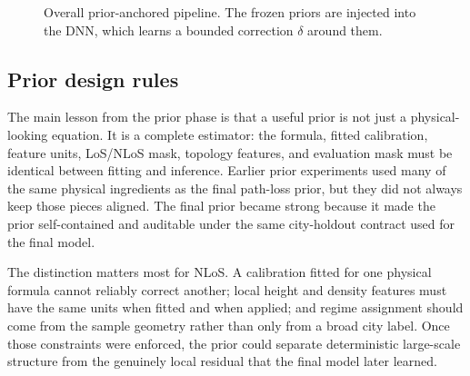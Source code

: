 \begin{figure}[H]
\centering
{}
\caption[Overall prior-anchored pipeline with bounded DNN corrections.]
{Overall prior-anchored pipeline. The frozen priors are injected into the DNN, which learns a bounded correction $\delta$ around them.}
\label{fig:pipeline}
\end{figure}

\subsection{Prior design rules}
\label{sec:good_prior_design}

The main lesson from the prior phase is that a useful prior is not just a
physical-looking equation. It is a complete estimator: the formula, fitted
calibration, feature units, LoS/NLoS mask, topology features, and evaluation
mask must be identical between fitting and inference. Earlier prior experiments
used many of the same physical ingredients as the final path-loss prior, but they did
not always keep those pieces aligned. The final prior became strong because it
made the prior self-contained and auditable under the same city-holdout
contract used for the final model.

The distinction matters most for NLoS. A calibration fitted for one physical
formula cannot reliably correct another; local height and density features
must have the same units when fitted and when applied; and regime assignment
should come from the sample geometry rather than only from a broad city label.
Once those constraints were enforced, the prior could separate deterministic
large-scale structure from the genuinely local residual that the final model later
learned.


